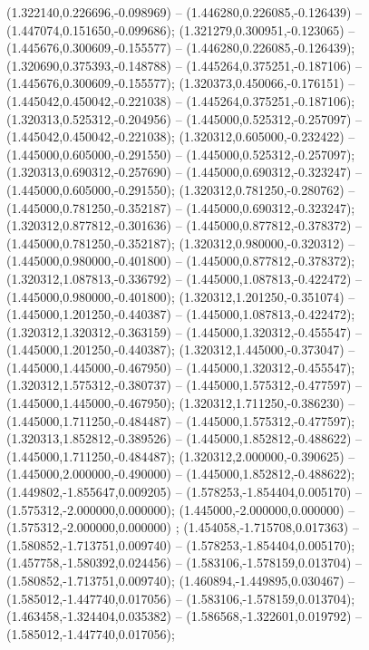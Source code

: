  (1.322140,0.226696,-0.098969) -- (1.446280,0.226085,-0.126439) -- (1.447074,0.151650,-0.099686);
 (1.321279,0.300951,-0.123065) -- (1.445676,0.300609,-0.155577) -- (1.446280,0.226085,-0.126439);
 (1.320690,0.375393,-0.148788) -- (1.445264,0.375251,-0.187106) -- (1.445676,0.300609,-0.155577);
 (1.320373,0.450066,-0.176151) -- (1.445042,0.450042,-0.221038) -- (1.445264,0.375251,-0.187106);
 (1.320313,0.525312,-0.204956) -- (1.445000,0.525312,-0.257097) -- (1.445042,0.450042,-0.221038);
 (1.320312,0.605000,-0.232422) -- (1.445000,0.605000,-0.291550) -- (1.445000,0.525312,-0.257097);
 (1.320313,0.690312,-0.257690) -- (1.445000,0.690312,-0.323247) -- (1.445000,0.605000,-0.291550);
 (1.320312,0.781250,-0.280762) -- (1.445000,0.781250,-0.352187) -- (1.445000,0.690312,-0.323247);
 (1.320312,0.877812,-0.301636) -- (1.445000,0.877812,-0.378372) -- (1.445000,0.781250,-0.352187);
 (1.320312,0.980000,-0.320312) -- (1.445000,0.980000,-0.401800) -- (1.445000,0.877812,-0.378372);
 (1.320312,1.087813,-0.336792) -- (1.445000,1.087813,-0.422472) -- (1.445000,0.980000,-0.401800);
 (1.320312,1.201250,-0.351074) -- (1.445000,1.201250,-0.440387) -- (1.445000,1.087813,-0.422472);
 (1.320312,1.320312,-0.363159) -- (1.445000,1.320312,-0.455547) -- (1.445000,1.201250,-0.440387);
 (1.320312,1.445000,-0.373047) -- (1.445000,1.445000,-0.467950) -- (1.445000,1.320312,-0.455547);
 (1.320312,1.575312,-0.380737) -- (1.445000,1.575312,-0.477597) -- (1.445000,1.445000,-0.467950);
 (1.320312,1.711250,-0.386230) -- (1.445000,1.711250,-0.484487) -- (1.445000,1.575312,-0.477597);
 (1.320313,1.852812,-0.389526) -- (1.445000,1.852812,-0.488622) -- (1.445000,1.711250,-0.484487);
 (1.320312,2.000000,-0.390625) -- (1.445000,2.000000,-0.490000) -- (1.445000,1.852812,-0.488622);
 (1.449802,-1.855647,0.009205) -- (1.578253,-1.854404,0.005170) -- (1.575312,-2.000000,0.000000);
 (1.445000,-2.000000,0.000000) -- (1.575312,-2.000000,0.000000) ;
 (1.454058,-1.715708,0.017363) -- (1.580852,-1.713751,0.009740) -- (1.578253,-1.854404,0.005170);
 (1.457758,-1.580392,0.024456) -- (1.583106,-1.578159,0.013704) -- (1.580852,-1.713751,0.009740);
 (1.460894,-1.449895,0.030467) -- (1.585012,-1.447740,0.017056) -- (1.583106,-1.578159,0.013704);
 (1.463458,-1.324404,0.035382) -- (1.586568,-1.322601,0.019792) -- (1.585012,-1.447740,0.017056);
